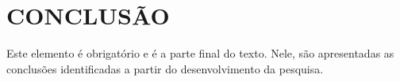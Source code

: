 \documentclass[
        english,			
        brazil			        %
        ,<...>]{abntbibufjf}
\begin{document}







\chapter{CONCLUS\~AO}

Este elemento \'e obrigat\'orio e \'e a parte final do texto.  Nele, s\~ao apresentadas as conclus\~oes identificadas a partir do desenvolvimento da pesquisa.

\end{document}
